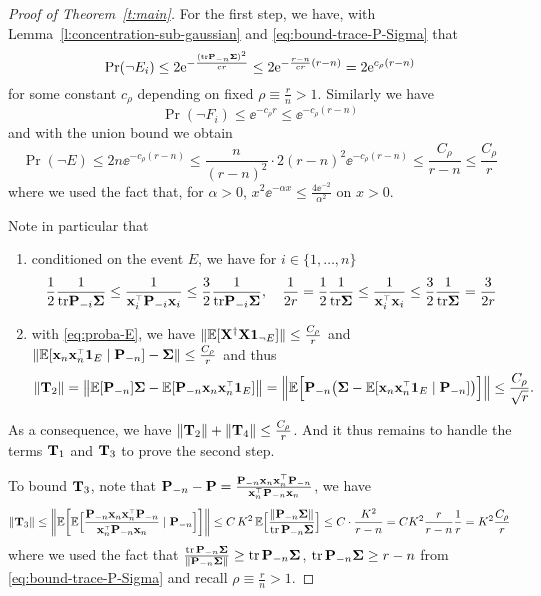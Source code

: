 \documentclass[11pt]{article}
\begin{document}
\begin{proof}[Proof of Theorem~\ref{t:main}]
\bigskip

For the first step, we have, with Lemma~\ref{l:concentration-sub-gaussian} and \eqref{eq:bound-trace-P-Sigma} that
\[
  \mathrm{Pr} (\neg E_i) \le 2 \mathrm{e}^{ - \frac{ (\mathrm{tr} \mathbf P_{-n} \mathbf{\Sigma})^2 }{c r} } \le 2 \mathrm{e}^{ - \frac{ r -n }{c r} (r-n) } = 2 \mathrm{e}^{c_\rho (r - n)}
\]
for some constant $c_\rho$ depending on fixed $\rho \equiv \frac{r}n > 1$. Similarly we have
\[
  \Pr (\neg F_i) \le \ee^{-c_\rho r} \le \ee^{-c_\rho (r-n)}
\]
and with the union bound we obtain
\begin{equation}\label{eq:proba-E}
  \Pr (\neg E) \le 2 n \ee^{-c_\rho (r-n)} \le \frac{n}{(r-n)^2} \cdot 2 (r-n)^2 \ee^{-c_\rho (r-n)} \le \frac{C_\rho}{r - n} \le \frac{C_\rho}{r}
\end{equation}
where we used the fact that, for $\alpha >0$, $x^2 \ee^{-\alpha x} \le \frac{4 \ee^{-2}}{\alpha^2}$ on $x > 0$.


\medskip

Note in particular that
\begin{enumerate}
  \item conditioned on the event $E$, we have for $i \in \{1, \ldots, n \}$
  \begin{equation}
    \frac12 \frac1{\tr \P_{-i} \Sigmab} \le \frac1{\x_i^\top \P_{-i} \x_i} \le \frac32 \frac1{\tr \P_{-i} \Sigmab}, \quad  \frac1{2r} = \frac12 \frac1{\tr \Sigmab} \le \frac1{\x_i^\top \x_i} \le \frac32 \frac1{\tr \Sigmab} = \frac3{2r} %
  \end{equation}
  \item with \eqref{eq:proba-E}, we have $\|\mathbb E[\mathbf X^\dagger\mathbf X\mathbf 1_{\neg E}]\|\leq \frac{C_\rho}{r}$ and $\|\E[\x_n\x_n^\top\one_E\mid\P_{-n}]-\Sigmab\|\leq
  \frac{C_\rho}{r}$ and thus
  \begin{align*}
  \| \T_2 \| = \big\|\E[\P_{-n}]\Sigmab -
  \E[\P_{-n}\x_n\x_n^\top\one_E]\big\|
    =\Big\|\E\Big[\P_{-n}\big(\Sigmab-\E[\x_n\x_n^\top\one_E\mid\P_{-n}]\big)\Big]\Big\|\leq \frac{C_\rho}{\sqrt{r}}.
  \end{align*}
\end{enumerate}

As a consequence, we have $\| \mathbf{T}_2 \| + \| \mathbf{T}_4 \| \le \frac{C_\rho}{r}$. And it thus remains to handle the terms $\mathbf{T}_1$ and $\mathbf{T}_3$ to prove the second step. 

To bound $\mathbf{T}_3$, note that  $\P_{-n} - \P = \frac{\P_{-n}\x_n\x_n^\top\P_{-n}}{\x_n^\top\P_{-n}\x_n}$, we have
\begin{align*}
\|\T_3\|\leq  \bigg\|
  \E\bigg[\E\Big[\frac{\P_{-n}\x_n\x_n^\top\P_{-n}}{\x_n^\top\P_{-n}\x_n}
  \mid \P_{-n}\Big]\bigg]\bigg\|  \leq
C\,K^2\,\E\Big[\frac{\|\P_{-n}\Sigmab\|}{\tr\,\P_{-n}\Sigmab}\Big]   
\leq C\cdot \frac{K^2}{r-n} =  C K^2 \frac{r}{r-n} \frac1r =  K^2 \frac{C_\rho}{r}
\end{align*}
where we used the fact that $\frac{\mathrm{tr}\,\mathbf P_{-n}\mathbf{\Sigma}} {\|\mathbf P_{-n}\mathbf{\Sigma}\|}\ge \mathrm{tr}\,\mathbf P_{-n}\mathbf{\Sigma} $, $\mathrm{tr}\,\mathbf P_{-n}\mathbf{\Sigma} \ge r -n $ from \eqref{eq:bound-trace-P-Sigma} and recall $\rho \equiv \frac{r}n > 1$.



\end{proof}
\end{document}
